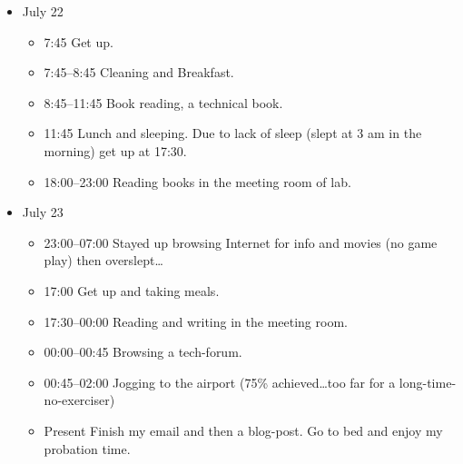 \documentclass{article}
\begin{document}
\begin{itemize}
\item July 22
  \begin{itemize}
  \item 7:45 Get up.
  \item 7:45--8:45 Cleaning and Breakfast.
  \item 8:45--11:45 Book reading, a technical book.
  \item 11:45 Lunch and sleeping. Due to lack of sleep (slept at 3 am
    in the morning) get up at 17:30.
  \item 18:00--23:00 Reading books in the meeting room of lab. 
  \end{itemize}
\item July 23
  \begin{itemize}
  \item 23:00--07:00 Stayed up browsing Internet for info and movies
    (no game play) then overslept\ldots
  \item 17:00 Get up and taking meals. 
  \item 17:30--00:00 Reading and writing in the meeting room.
  \item 00:00--00:45 Browsing a tech-forum.
  \item 00:45--02:00 Jogging to the airport (75\% achieved\ldots too
    far for a long-time-no-exerciser)
  \item Present Finish my email and then a blog-post. Go to bed and
    enjoy my probation time.
  \end{itemize}
\end{itemize}
\end{document}
